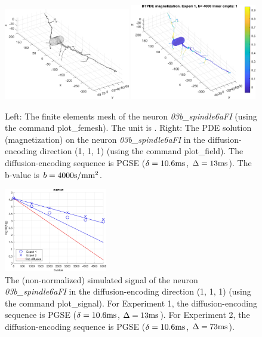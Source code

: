\documentclass[a4paper]{article}
\begin{document}
\begin{figure}
    \centering
    \includegraphics[width=0.49\textwidth]{paper_neuron/03a_spindle6aFI_FEmesh.jpg}
    \includegraphics[width=0.49\textwidth]{paper_neuron/03a_spindle6aFI_PDESOLUTION.jpg}
    \caption{Left: The finite elements mesh of the neuron {\it 03b\_spindle6aFI} (using the command plot\_femesh). The unit is \lunit. Right: The PDE solution (magnetization) on the neuron {\it 03b\_spindle6aFI} in the diffusion-encoding direction (1, 1, 1) (using the command plot\_field). The diffusion-encoding sequence is PGSE ($\delta=10.6\mathrm{ms}$, $\Delta=13\mathrm{ms}$). The b-value is $b=4000\mathrm{s}/\text{mm}^2$.}
    \label{fig:spindle}
\end{figure}

\begin{figure}
    \centering
    \includegraphics[width=0.4\textwidth]{paper_neuron/03a_spindle6aFI_PLOTSIGNAL.jpg}
    \caption{The (non-normalized) simulated signal of the neuron {\it 03b\_spindle6aFI} in the diffusion-encoding direction (1, 1, 1) (using the command plot\_signal). For Experiment 1, the diffusion-encoding sequence is PGSE ($\delta=10.6\mathrm{ms}$, $\Delta=13\mathrm{ms}$). For Experiment 2, the diffusion-encoding sequence is PGSE ($\delta=10.6\mathrm{ms}$, $\Delta=73\mathrm{ms}$).}
    \label{fig:signal_neuronmodule}
\end{figure}
\end{document}
